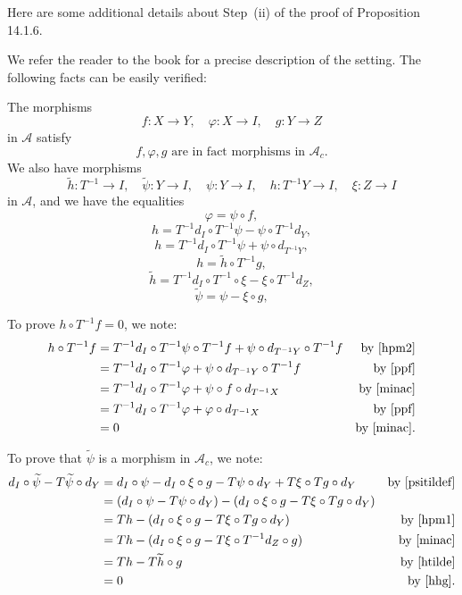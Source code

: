 \documentclass[12pt]{article}
\theoremstyle{remark}
\theoremstyle{definition}
\newcommand{\A}{\mathcal A}
\newcommand{\pp}{\varphi}
\begin{document}
Here are some additional details about Step~(ii) of the proof of Proposition 14.1.6. 

We refer the reader to the book for a precise description of the setting. The following facts can be easily verified: 

The morphisms 
$$
f:X\to Y,\quad\pp:X\to I,\quad g:Y\to Z
$$ 
in $\A$ satisfy 
%
\begin{equation}\label{minac}
f,\pp,g\text{ are in fact morphisms in }\A_c.
\end{equation}
%
We also have morphisms 
$$
\widetilde h:T^{-1}\to I,\quad\widetilde\psi:Y\to I,\quad\psi:Y\to I,\quad h:T^{-1}Y\to I,\quad\xi:Z\to I
$$ 
in $\A$, and we have the equalities 
%
\begin{equation}\label{ppf}
\pp=\psi\circ f,
\end{equation}
%
\begin{equation}\label{hpm1}
h=T^{-1}d_I\circ T^{-1}\psi-\psi\circ T^{-1}d_Y,
\end{equation}
%
\begin{equation}\label{hpm2}
h=T^{-1}d_I\circ T^{-1}\psi+\psi\circ d_{T^{-1}Y},
\end{equation}
%
\begin{equation}\label{hhg}
h=\widetilde h\circ T^{-1}g,
\end{equation}
%
\begin{equation}\label{htilde}
\widetilde h=T^{-1}d_I\circ T^{-1}\circ\xi-\xi\circ T^{-1}d_Z,
\end{equation}
%
\begin{equation}\label{psitildef}
\widetilde\psi=\psi-\xi\circ g,
\end{equation}

To prove $h\circ T^{-1}f=0$, we note: 
%
\begin{align*}
h\circ T^{-1}f&=T^{-1}d_I\circ T^{-1}\psi\circ T^{-1}f+\psi\circ d_{T^{-1}Y}\circ T^{-1}f&\text{by \eqref{hpm2}}\\ 
&=T^{-1}d_I\circ T^{-1}\pp+\psi\circ d_{T^{-1}Y}\circ T^{-1}f&\text{by \eqref{ppf}}\\ 
&=T^{-1}d_I\circ T^{-1}\pp+\psi\circ f\circ d_{T^{-1}X}&\text{by \eqref{minac}}\\ 
&=T^{-1}d_I\circ T^{-1}\pp+\pp\circ d_{T^{-1}X}&\text{by \eqref{ppf}}\\ 
&=0&\text{by \eqref{minac}}. 
\end{align*}

To prove that $\widetilde\psi$ is a morphism in $\A_c$, we note: 
%
\begin{align*}
d_I\circ\widetilde\psi-T\widetilde\psi\circ d_Y&=d_I\circ\psi-d_I\circ\xi\circ g-T\psi\circ d_Y+T\xi\circ Tg\circ d_Y&\text{by \eqref{psitildef}}\\ 
&=(d_I\circ\psi-T\psi\circ d_Y)-(d_I\circ\xi\circ g-T\xi\circ Tg\circ d_Y)\\ 
&=Th-(d_I\circ\xi\circ g-T\xi\circ Tg\circ d_Y)&\text{by \eqref{hpm1}}\\ 
&=Th-(d_I\circ\xi\circ g-T\xi\circ T^{-1}d_Z\circ g)&\text{by \eqref{minac}}\\ 
&=Th-T\widetilde h\circ g&\text{by \eqref{htilde}}\\ 
&=0&\text{by \eqref{hhg}}. 
\end{align*}
\end{document}
